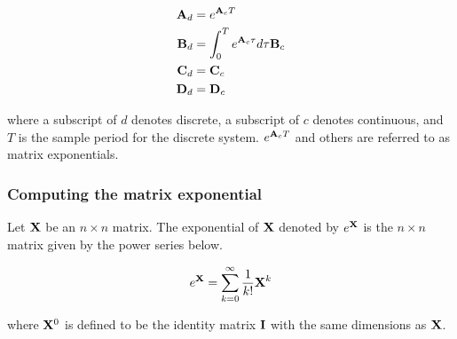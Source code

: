 \begin{align}
  \mathbf{A}_d &= e^{\mathbf{A}_c T} \\
  \mathbf{B}_d &= \int_0^T e^{\mathbf{A}_c \tau} d\tau \mathbf{B}_c \\
  \mathbf{C}_d &= \mathbf{C}_c \\
  \mathbf{D}_d &= \mathbf{D}_c
\end{align}

where a subscript of $d$ denotes discrete, a subscript of $c$ denotes
continuous, and $T$ is the sample period for the discrete system.
$e^{\mathbf{A}_c T}$ and others are referred to as matrix exponentials. \\

\subsubsection{Computing the matrix exponential}

Let $\mathbf{X}$ be an $n \times n$ matrix. The exponential of $\mathbf{X}$ denoted by
$e^{\mathbf{X}}$ is the $n \times n$ matrix given by the power series below.

\begin{equation}
  e^{\mathbf{X}} = \sum_{k=0}^\infty \frac{1}{k!} \mathbf{X}^k
\end{equation}

where $\mathbf{X}^0$ is defined to be the identity matrix $\mathbf{I}$ with the same
dimensions as $\mathbf{X}$.
